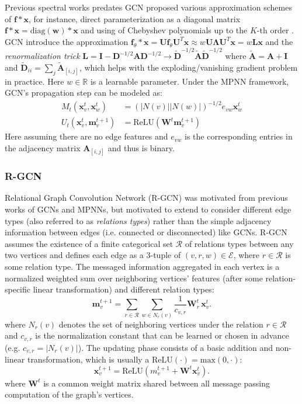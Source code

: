 Previous spectral works predates GCN proposed various approximation schemes of
$\mathbf{f}* \mathbf{x}$, for instance, direct parameterization as a diagonal
matrix $\mathbf{f} * \mathbf{x} = \text{diag}(\mathbf{w}) * \mathbf{x}$
\citep{brunaSpectralNetworksLocally2014} and using of Chebyshev polynomials up to the $K$-th
order \citep{defferrardConvolutionalNeuralNetworks2016}. GCN introduce the approximation $\mathbf{f}_{\theta} *
\mathbf{x} = \mathbf{Uf}_{\theta} \mathbf{U}^T \mathbf{x} \approx w
\mathbf{U\Lambda}\mathbf{U}^T \mathbf{x} = w \mathbf{L}\mathbf{x}$ and the
\textit{renormalization trick} $\mathbf{L} =
\mathbf{I}-\mathbf{D}^{-1/2}\mathbf{A}\mathbf{D}^{-1/2} \to
\tilde{\mathbf{D}}^{-1/2} \tilde{\mathbf{A}}\tilde{\mathbf{D}}^{-1/2}$ where
$\tilde{\mathbf{A}} = \mathbf{A} + \mathbf{I}$ and $\tilde{\mathbf{D}}_{ii} =
\sum_{j}\tilde{\mathbf{A}}_{[i,j]}$, which helps with the exploding/vanishing
gradient problem in practice. Here $w \in \mathbb{R}$ is a learnable parameter.
Under the MPNN framework, GCN's propagation step can be modeled as:
\begin{align*}
  M_t(\mathbf{x}_v^t, \mathbf{x}_w^t) &=
  (|N(v)||N(w)|)^{-1/2}e_{vw}\mathbf{x}_{w}^t \\
  U_t(\mathbf{x}_{v}^t, \mathbf{m}_{v}^{t+1}) &= \text{ReLU}(\mathbf{W}^t
  \mathbf{m}_{v}^{t+1})
\end{align*}
Here assuming there are no edge features and $e_{vw}$ is the corresponding
entries in the adjacency matrix $\mathbf{A}_{[i,j]}$ and thus is binary.

\subsubsection{R-GCN \citep{schlichtkrullModelingRelationalData2018}}

Relational Graph Convolution Network (R-GCN)
\citep{schlichtkrullModelingRelationalData2018} was motivated from previous works
of GCNs and MPNNs, but motivated to extend to consider different edge types
(also referred to as \textit{relations types}) rather than the simple adjacency
information between edges (i.e. connected or disconnected) like GCNs. R-GCN
assumes the existence of a finite categorical set $\mathcal{R}$ of relations
types between any two vertices and defines each edge as a $3$-tuple of $(v, r,
w) \in \mathcal{E}$, where $r \in \mathcal{R}$ is some relation type. The
messaged information aggregated in each vertex is a normalized weighted sum over
neighboring vertices' features (after some relation-specific linear
transformation) and different relation types:
$$
\mathbf{m}_{v}^{t+1} = \sum_{r \in \mathcal{R}} \sum_{w \in N_r(v)}
\frac{1}{c_{v,r}} \mathbf{W}_{r}^t \,\mathbf{x}_{v}^t
.$$
where $N_r(v)$ denotes the set of neighboring vertices under the relation $r \in
\mathcal{R}$ and $c_{v,r}$ is the normalization constant that can be learned or
chosen in advance (e.g. $c_{v,r} = |N_r(v)|$). The updating phase consists of a
basic addition and non-linear transformation, which is usually a
$\text{ReLU}(\cdot) = \text{max}(0, \cdot)$:
$$
\mathbf{x}_{v}^{t+1} = \text{ReLU}(m_{v}^{t+1} + \mathbf{W}^t \mathbf{x}_{v}^t)
.$$
where $\mathbf{W}^t$ is a common weight matrix shared between all message
passing computation of the graph's vertices.

